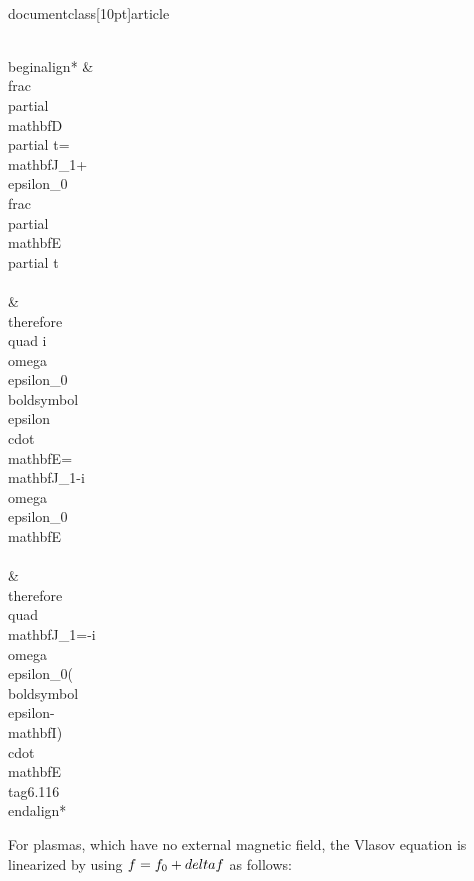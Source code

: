 \\documentclass[10pt]{article}
\begin{document}
{{{{\\begin{align*}
& \\frac{\\partial \\mathbf{D}}{\\partial t}=\\mathbf{J}_{1}+\\epsilon_{0} \\frac{\\partial \\mathbf{E}}{\\partial t} \\\\
& \\therefore \\quad i \\omega \\epsilon_{0} \\boldsymbol{\\epsilon} \\cdot \\mathbf{E}=\\mathbf{J}_{1}-i \\omega \\epsilon_{0} \\mathbf{E} \\\\
& \\therefore \\quad \\mathbf{J}_{1}=-i \\omega \\epsilon_{0}(\\boldsymbol{\\epsilon}-\\mathbf{I}) \\cdot \\mathbf{E} \\tag{6.116}
\\end{align*}


For plasmas, which have no external magnetic field, the Vlasov equation is linearized by using $f=f_{0}+\\delta f$ as follows:

}}}}
\end{document}
